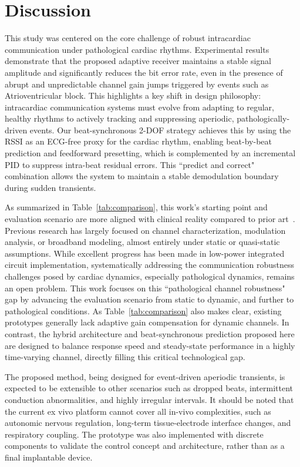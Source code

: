 \documentclass[journal]{IEEEtran}
\begin{document}
\section{Discussion}
\label{sec:discussion}

This study was centered on the core challenge of robust intracardiac communication under pathological cardiac rhythms. Experimental results demonstrate that the proposed adaptive receiver maintains a stable signal amplitude and significantly reduces the bit error rate, even in the presence of abrupt and unpredictable channel gain jumps triggered by events such as Atrioventricular block. This highlights a key shift in design philosophy: intracardiac communication systems must evolve from adapting to regular, healthy rhythms to actively tracking and suppressing aperiodic, pathologically-driven events. Our beat-synchronous 2-DOF strategy achieves this by using the RSSI as an ECG-free proxy for the cardiac rhythm, enabling beat-by-beat prediction and feedforward presetting, which is complemented by an incremental PID to suppress intra-beat residual errors. This ``predict and correct" combination allows the system to maintain a stable demodulation boundary during sudden transients.

As summarized in Table~\ref{tab:comparison}, this work's starting point and evaluation scenario are more aligned with clinical reality compared to prior art~\cite{bereuter2019leadless,ryser2022modulation,khaleghi2020conductive,yuk2020implantable}.
Previous research has largely focused on channel characterization, modulation analysis, or broadband modeling, almost entirely under static or quasi-static assumptions.
While excellent progress has been made in low-power integrated circuit implementation, systematically addressing the communication robustness challenges posed by cardiac dynamics, especially pathological dynamics, remains an open problem.
This work focuses on this ``pathological channel robustness" gap by advancing the evaluation scenario from static to dynamic, and further to pathological conditions. As Table~\ref{tab:comparison} also makes clear, existing prototypes generally lack adaptive gain compensation for dynamic channels.
In contrast, the hybrid architecture and beat-synchronous prediction proposed here are designed to balance response speed and steady-state performance in a highly time-varying channel, directly filling this critical technological gap.

The proposed method, being designed for event-driven aperiodic transients, is expected to be extensible to other scenarios such as dropped beats, intermittent conduction abnormalities, and highly irregular intervals. It should be noted that the current ex vivo platform cannot cover all in-vivo complexities, such as autonomic nervous regulation, long-term tissue-electrode interface changes, and respiratory coupling. The prototype was also implemented with discrete components to validate the control concept and architecture, rather than as a final implantable device.
\end{document}
